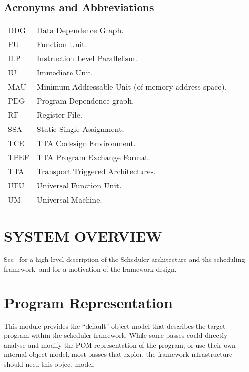 \documentclass[a4paper,twoside]{tce}
\begin{document}
\section{Acronyms and Abbreviations}

\begin{center}
\begin{longtable}{p{}p{}}
  DDG   & Data Dependence Graph. \\
  FU    & Function Unit.\\
  ILP   & Instruction Level Parallelism.\\
  IU    & Immediate Unit.\\
  MAU   & Minimum Addressable Unit (of memory address space).\\
  PDG   & Program Dependence graph.\\
  RF    & Register File.\\
  SSA   & Static Single Assignment.\\
  TCE   & TTA Codesign Environment.\\
  TPEF  & TTA Program Exchange Format.\\
  TTA   & Transport Triggered Architectures.\\
  UFU   & Universal Function Unit.\\
  UM    & Universal Machine.\\
\end{longtable}
\end{center}



\chapter{SYSTEM OVERVIEW}

See~\cite{SchedulerArchitecture} for a high-level description of
the Scheduler architecture and the scheduling framework, and for a
motivation of the framework design.



\chapter{Program Representation}
\label{ch:ProgramRepresentation}

This module provides the ``default'' object model that describes the target
program within the scheduler framework. While some passes could directly
analyse and modify the POM representation of the program, or use their own
internal object model, most passes that exploit the framework infrastructure
should need this object model.
\end{document}
